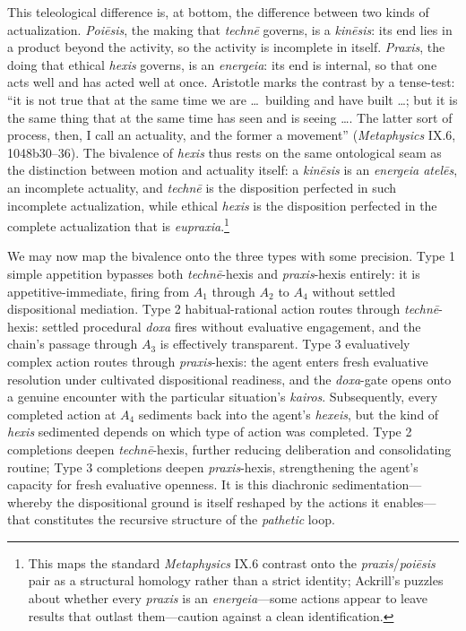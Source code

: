 \documentclass{article}
\begin{document}
This teleological difference is, at bottom, the difference between two kinds of actualization. \textit{Poiēsis}, the making that \textit{technē} governs, is a \textit{kinēsis}: its end lies in a product beyond the activity, so the activity is incomplete in itself. \textit{Praxis}, the doing that ethical \textit{hexis} governs, is an \textit{energeia}: its end is internal, so that one acts well and has acted well at once. Aristotle marks the contrast by a tense-test: ``it is not true that at the same time we are \ldots\ building and have built \ldots; but it is the same thing that at the same time has seen and is seeing \ldots. The latter sort of process, then, I call an actuality, and the former a movement'' (\textit{Metaphysics} IX.6, 1048b30--36). The bivalence of \textit{hexis} thus rests on the same ontological seam as the distinction between motion and actuality itself: a \textit{kinēsis} is an \textit{energeia atelēs}, an incomplete actuality, and \textit{technē} is the disposition perfected in such incomplete actualization, while ethical \textit{hexis} is the disposition perfected in the complete actualization that is \textit{eupraxia}.\footnote{This maps the standard \textit{Metaphysics} IX.6 contrast onto the \textit{praxis}/\textit{poiēsis} pair as a structural homology rather than a strict identity; Ackrill's puzzles about whether every \textit{praxis} is an \textit{energeia}---some actions appear to leave results that outlast them---caution against a clean identification.}

We may now map the bivalence onto the three types with some precision. Type 1 simple appetition bypasses both \textit{techn\=e}-hexis and \textit{praxis}-hexis entirely: it is appetitive-immediate, firing from $A_1$ through $A_2$ to $A_4$ without settled dispositional mediation. Type 2 habitual-rational action routes through \textit{techn\=e}-hexis: settled procedural \textit{doxa} fires without evaluative engagement, and the chain's passage through $A_3$ is effectively transparent. Type 3 evaluatively complex action routes through \textit{praxis}-hexis: the agent enters fresh evaluative resolution under cultivated dispositional readiness, and the \textit{doxa}-gate opens onto a genuine encounter with the particular situation's \textit{kairos}. Subsequently, every completed action at $A_4$ sediments back into the agent's \textit{hexeis}, but the kind of \textit{hexis} sedimented depends on which type of action was completed. Type 2 completions deepen \textit{techn\=e}-hexis, further reducing deliberation and consolidating routine; Type 3 completions deepen \textit{praxis}-hexis, strengthening the agent's capacity for fresh evaluative openness. It is this diachronic sedimentation---whereby the dispositional ground is itself reshaped by the actions it enables---that constitutes the recursive structure of the \textit{pathetic} loop.
\end{document}
